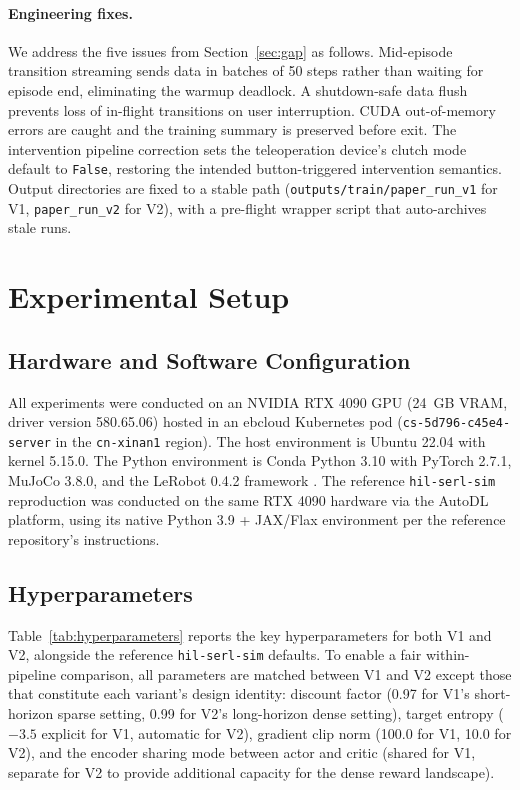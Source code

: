 \documentclass[12pt,a4paper]{article}
\begin{document}
\paragraph{Engineering fixes.} We address the five issues from Section~\ref{sec:gap} as follows. Mid-episode transition streaming sends data in batches of 50 steps rather than waiting for episode end, eliminating the warmup deadlock. A shutdown-safe data flush prevents loss of in-flight transitions on user interruption. CUDA out-of-memory errors are caught and the training summary is preserved before exit. The intervention pipeline correction sets the teleoperation device's clutch mode default to \texttt{False}, restoring the intended button-triggered intervention semantics. Output directories are fixed to a stable path (\texttt{outputs/train/paper\_run\_v1} for V1, \texttt{paper\_run\_v2} for V2), with a pre-flight wrapper script that auto-archives stale runs.

\section{Experimental Setup} \label{sec:setup}

\subsection{Hardware and Software Configuration}

All experiments were conducted on an NVIDIA RTX 4090 GPU (24~GB VRAM, driver version 580.65.06) hosted in an ebcloud Kubernetes pod (\texttt{cs-5d796-c45e4-server} in the \texttt{cn-xinan1} region). The host environment is Ubuntu 22.04 with kernel 5.15.0. The Python environment is Conda Python 3.10 with PyTorch 2.7.1, MuJoCo 3.8.0, and the LeRobot 0.4.2 framework \citep{cadene2024lerobot}. The reference \texttt{hil-serl-sim} reproduction was conducted on the same RTX 4090 hardware via the AutoDL platform, using its native Python 3.9 + JAX/Flax environment per the reference repository's instructions.

\subsection{Hyperparameters}

Table~\ref{tab:hyperparameters} reports the key hyperparameters for both V1 and V2, alongside the reference \texttt{hil-serl-sim} defaults. To enable a fair within-pipeline comparison, all parameters are matched between V1 and V2 except those that constitute each variant's design identity: discount factor (0.97 for V1's short-horizon sparse setting, 0.99 for V2's long-horizon dense setting), target entropy ($-3.5$ explicit for V1, automatic for V2), gradient clip norm (100.0 for V1, 10.0 for V2), and the encoder sharing mode between actor and critic (shared for V1, separate for V2 to provide additional capacity for the dense reward landscape).
\end{document}

